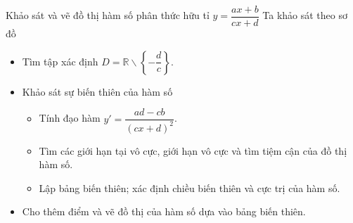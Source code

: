 \begin{dang}{Khảo sát và vẽ đồ thị hàm số phân thức hữu tỉ $y=\dfrac{ax+b}{cx+d}$}
	Ta khảo sát theo sơ đồ
	\begin{itemize}
		\item[\iconCH]  Tìm tập xác định $D=\mathbb{R}\backslash \left\{-\dfrac{d}{c}\right\}$.
		\item [\iconCH]  Khảo sát sự biến thiên của hàm số
		\begin{itemize}
			\item Tính đạo hàm $y'=\dfrac{ad-cb}{(cx+d)^2}$.
			\item Tìm các giới hạn tại vô cực, giới hạn vô cực và tìm tiệm cận của đồ thị hàm số.
			\item Lập bảng biến thiên; xác định chiều biến thiên và cực trị của hàm số.
		\end{itemize}
		\item [\iconCH]  Cho thêm điểm và vẽ đồ thị của hàm số dựa vào bảng biến thiên.
	\end{itemize}
\end{dang}
